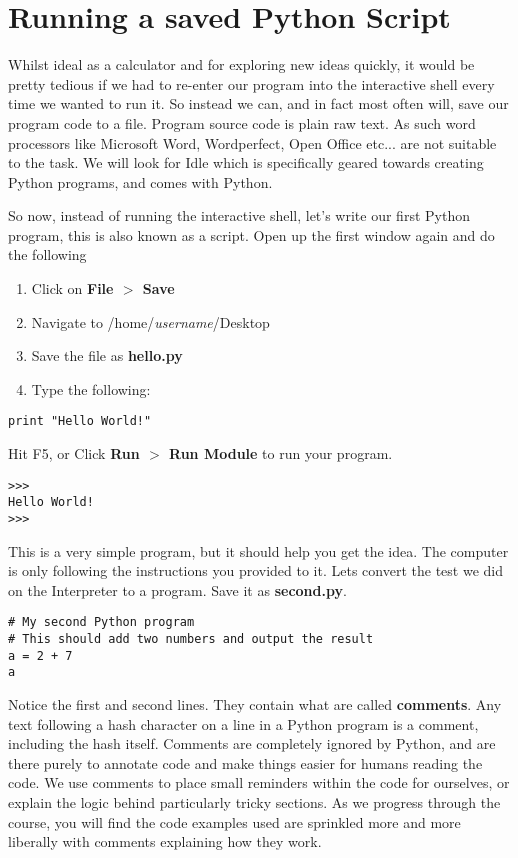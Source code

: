 \section{Running a saved Python Script}

Whilst ideal as a calculator and for exploring new ideas quickly, it   would be pretty tedious if we had to re-enter our program into the   interactive shell every time we wanted to run it. So instead we can,   and in fact most often will, save our program code to a file. Program   source code is plain raw text. As such word processors like Microsoft   Word, Wordperfect, Open Office etc... are not suitable to the task. We will   look for Idle which is specifically geared towards creating Python programs,   and comes with   Python. 

So now, instead of running the interactive shell, let's write our   first Python program, this is also known as a script. Open up the first window again and do the following
\begin{enumerate}
    \item Click on \textbf{File $>$ Save}
    \item Navigate to /home/\textit{username}/Desktop
    \item Save the file as \textbf{hello.py}
    \item Type the following:
\end{enumerate}
\begin{lstlisting}
print "Hello World!"
\end{lstlisting}

Hit F5, or Click \textbf{Run $>$ Run Module} to    run your program.


\begin{lstlisting}
>>>
Hello World!
>>>
\end{lstlisting}

This is a very simple program, but it should help you get the    idea. The computer is only following the instructions you provided   to it. Lets convert the test we did on the Interpreter to a program.   Save it as \textbf{second.py}.   
\begin{lstlisting}
# My second Python program
# This should add two numbers and output the result
a = 2 + 7
a
\end{lstlisting}

Notice the first and second lines. They contain what are called   \textbf{comments}. Any text following a hash character on a   line in a Python program is a comment, including the hash itself.   Comments are completely ignored by Python, and are there purely to   annotate code and make things easier for humans reading the code. We   use comments to place small reminders within the code for ourselves, or   explain the logic behind particularly tricky sections. As we   progress through the course, you will find the code examples used are   sprinkled more and more liberally with comments explaining how they   work.

